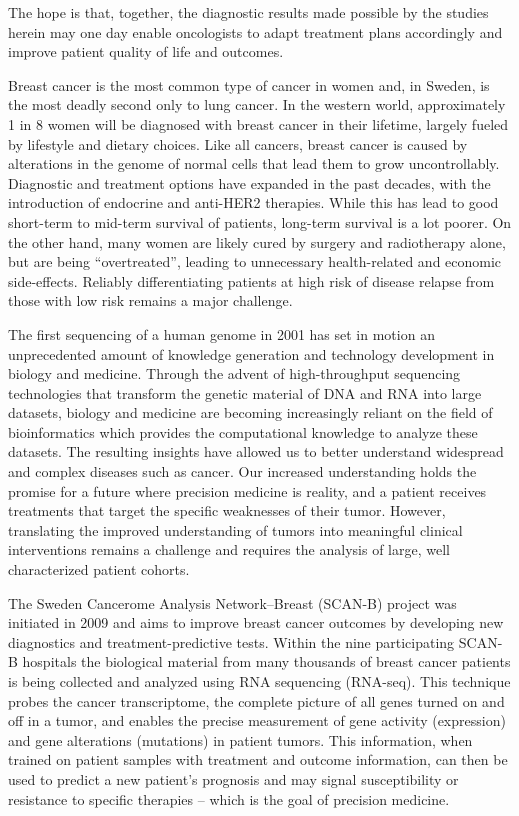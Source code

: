 \documentclass[11pt]{book}
\newcommand{\scanb}{\mbox{SCAN-B}}
\begin{document}
The hope is that, together, the diagnostic results made possible by the studies herein may one day enable oncologists to adapt treatment plans accordingly and improve patient quality of life and outcomes.



Breast cancer is the most common type of cancer in women and, in Sweden, is the most deadly second only to lung cancer. In the western world, approximately 1 in 8 women will be diagnosed with breast cancer in their lifetime, largely fueled by lifestyle and dietary choices. Like all cancers, breast cancer is caused by alterations in the genome of normal cells that lead them to grow uncontrollably. Diagnostic and treatment options have expanded in the past decades, with the introduction of endocrine and anti-HER2 therapies. While this has lead to good short-term to mid-term survival of patients, long-term survival is a lot poorer. On the other hand, many women are likely cured by surgery and radiotherapy alone, but are being ``overtreated'', leading to unnecessary health-related and economic side-effects. Reliably differentiating patients at high risk of disease relapse from those with low risk remains a major challenge.

The first sequencing of a human genome in 2001 has set in motion an unprecedented amount of knowledge generation and technology development in biology and medicine. Through the advent of high-throughput sequencing technologies that transform the genetic material of DNA and RNA into large datasets, biology and medicine are becoming increasingly reliant on the field of bioinformatics which provides the computational knowledge to analyze these datasets. The resulting insights have allowed us to better understand widespread and complex diseases such as cancer. Our increased understanding holds the promise for a future where precision medicine is reality, and a patient receives treatments that target the specific weaknesses of their tumor. However, translating the improved understanding of tumors into meaningful clinical interventions remains a challenge and requires the analysis of large, well characterized patient cohorts.

The Sweden Cancerome Analysis Network--Breast (\scanb{}) project was initiated in 2009 and aims to improve breast cancer outcomes by developing new diagnostics and treatment-predictive tests. Within the nine participating \scanb{} hospitals the biological material from many thousands of breast cancer patients is being collected and analyzed using RNA sequencing (RNA-seq). This technique probes the cancer transcriptome, the complete picture of all genes turned on and off in a tumor, and enables the precise measurement of gene activity (expression) and gene alterations (mutations) in patient tumors. This information, when trained on patient samples with treatment and outcome information, can then be used to predict a new patient's prognosis and may signal susceptibility or resistance to specific therapies -- which is the goal of precision medicine.
\end{document}
